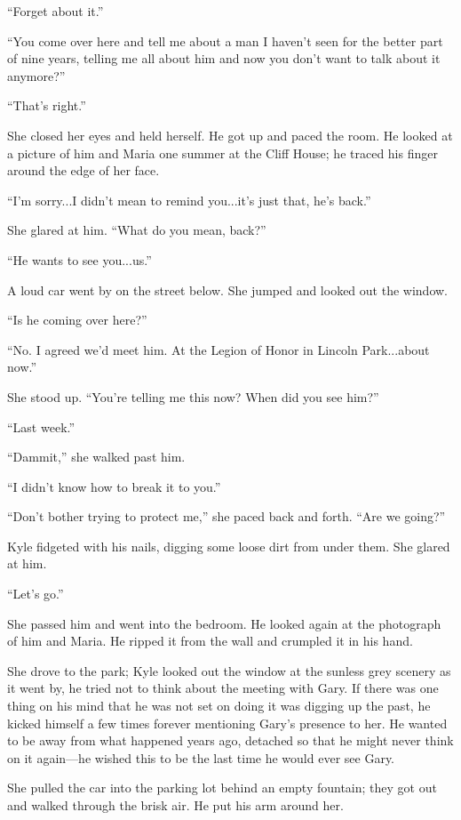 ``Forget about it.''

``You come over here and tell me about a man I haven't seen for the
better part of nine years, telling me all about him and now you don't
want to talk about it anymore?''

``That's right.''

She closed her eyes and held herself. He got up and paced the room. He
looked at a picture of him and Maria one summer at the Cliff House; he
traced his finger around the edge of her face.

``I'm sorry...I didn't mean to remind you...it's just that, he's back.''

She glared at him. ``What do you mean, back?''

``He wants to see you...us.''

A loud car went by on the street below. She jumped and looked out the
window.

``Is he coming over here?''

``No. I agreed we'd meet him. At the Legion of Honor in Lincoln
Park...about now.''

She stood up. ``You're telling me this now? When did you see him?''

``Last week.''

``Dammit,'' she walked past him.

``I didn't know how to break it to you.''

``Don't bother trying to protect me,'' she paced back and forth. ``Are
we going?''

Kyle fidgeted with his nails, digging some loose dirt from under them.
She glared at him.

``Let's go.''

She passed him and went into the bedroom. He looked again at the
photograph of him and Maria. He ripped it from the wall and crumpled it
in his hand.

She drove to the park; Kyle looked out the window at the sunless grey
scenery as it went by, he tried not to think about the meeting with
Gary. If there was one thing on his mind that he was not set on doing it
was digging up the past, he kicked himself a few times forever
mentioning Gary's presence to her. He wanted to be away from what
happened years ago, detached so that he might never think on it
again---he wished this to be the last time he would ever see Gary.

She pulled the car into the parking lot behind an empty fountain; they
got out and walked through the brisk air. He put his arm around her.

